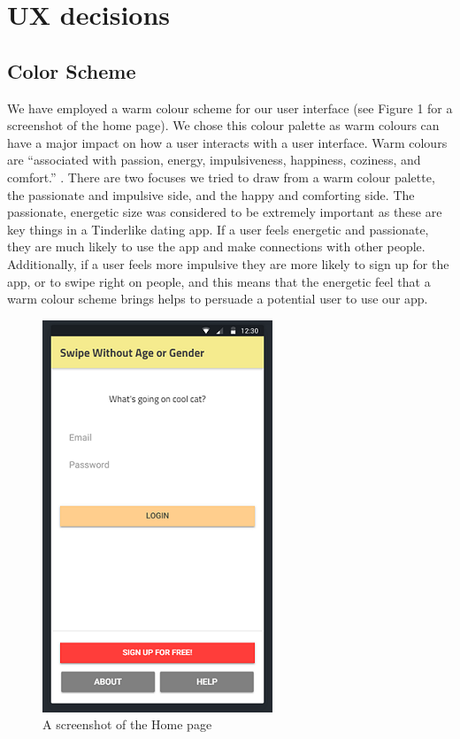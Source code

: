 \documentclass[a4paper, 11pt]{article}
\begin{document}
\section{UX decisions} 
\subsection{Color Scheme}

We have employed a warm colour scheme for our user interface (see Figure 1 for a screenshot of the home page). We chose this colour palette as warm colours can have a major impact on how a user interacts with a user interface. Warm colours are ``associated with passion, energy, impulsiveness, happiness, coziness, and comfort.” \cite{color}. There are two focuses we tried to draw from a warm colour palette, the passionate and impulsive side, and the happy and comforting side. The passionate, energetic size was considered to be extremely important as these are key things in a Tinderlike dating app. If a user feels energetic and passionate, they are much likely to use the app and make connections with other people. Additionally, if a user feels more impulsive they are more likely to sign up for the app, or to swipe right on people, and this means that the energetic feel that a warm colour scheme brings helps to persuade a potential user to use our app.

\begin{figure}
\centering
\includegraphics{WarmColours.png}
\caption{A screenshot of the Home page}
\end{figure}
\end{document}
